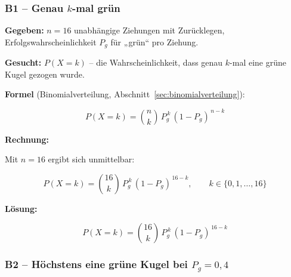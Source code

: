 \subsubsection*{B1 – Genau $k$-mal grün}

\begin{beispiel}[Binomialverteilung]

\textbf{Gegeben:} $n = 16$ unabhängige Ziehungen mit Zurücklegen,
Erfolgswahrscheinlichkeit $P_g$ für „grün`` pro Ziehung.

\textbf{Gesucht:} $P(X = k)$ -- die Wahrscheinlichkeit, dass genau $k$-mal eine
grüne Kugel gezogen wurde.

\textbf{Formel} (Binomialverteilung, Abschnitt~\ref{sec:binomialverteilung}):

$$
P(X = k) = \binom{n}{k}\, P_g^{\,k}\,(1 - P_g)^{\,n-k}
$$

\textbf{Rechnung:}

Mit $n = 16$ ergibt sich unmittelbar:

$$
P(X = k) = \binom{16}{k}\, P_g^{\,k}\,(1 - P_g)^{\,16-k},
\qquad k \in \{0, 1, \ldots, 16\}
$$

\textbf{Lösung:}

$$
\boxed{P(X = k) = \binom{16}{k}\, P_g^{\,k}\,(1 - P_g)^{\,16-k}}
$$

\end{beispiel}

\subsubsection*{B2 – Höchstens eine grüne Kugel bei $P_g = 0{,}4$}

